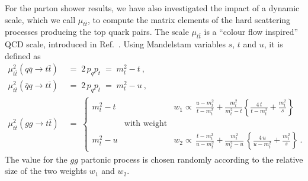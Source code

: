 For the parton shower results, we have also investigated the impact of
a dynamic scale, which we call $\mu_{t\bar t}$, 
to compute the matrix elements of the hard
scattering processes producing the top quark pairs.
The scale $\mu_{t\bar t}$ is a ``colour flow inspired'' QCD scale,  introduced
in Ref.~\cite{Hoeche:2013mua}. Using Mandelstam variables $s$, $t$ and
$u$, it is defined as
\begin{align}
  \mu_{t\bar t}^2(q\bar q\to t\bar t)&\;=\;2\,p_q p_t\;=\;m_t^2-t~,\nonumber\\[1mm]
  \mu_{t\bar t}^2(\bar qq\to t\bar t)&\;=\;2\,p_q p_t\;=\;m_t^2-u~,\nonumber\\[1mm]
  \mu_{t\bar t}^2(gg\to t\bar t)&\;=\;\left\{\begin{array}{ccl}
  m_t^2-t&&w_1\varpropto\,\frac{u-m_t^2}{t-m_t^2}+
    \frac{m_t^2}{m_t^2-t}\left\{\frac{4\,t}{t-m_t^2}+\frac{m_t^2}{s}\right\}\\
  &\text{with weight}&\\
  m_t^2-u&&w_2\varpropto\,\frac{t-m_t^2}{u-m_t^2}+
    \frac{m_t^2}{m_t^2-u}\,\left\{\frac{4\,u}{u-m_t^2}+\frac{m_t^2}{s}\right\}~.
  \end{array}\right.
  \label{eq:scale_ttb}
\end{align}
The value for the $gg$ partonic process is chosen randomly
according to the relative size of the two weights $w_1$ and $w_2$.

